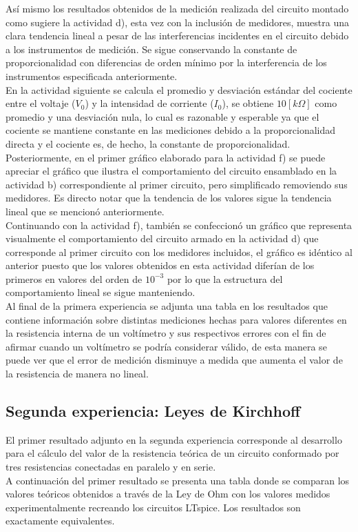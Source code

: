 \documentclass[letterpaper,11pt]{article} %
\begin{document}
Así mismo los resultados obtenidos de la medición realizada del circuito montado como sugiere la actividad d), esta vez con la inclusión de medidores, muestra una clara tendencia lineal a pesar de las interferencias incidentes en el circuito debido a los instrumentos de medición. Se sigue conservando la constante de proporcionalidad con diferencias de orden mínimo por la interferencia de los instrumentos especificada anteriormente. \\

En la actividad siguiente se calcula el promedio y desviación estándar del cociente entre el voltaje ($V_0$) y la intensidad de corriente ($I_0$), se obtiene $10 [k\Omega]$ como promedio y una desviación nula, lo cual es razonable y esperable ya que el cociente se mantiene constante en las mediciones debido a la proporcionalidad directa y el cociente es, de hecho, la constante de proporcionalidad. \\

Posteriormente, en el primer gráfico elaborado para la actividad f) se puede apreciar el gráfico que ilustra el comportamiento del circuito ensamblado en la actividad b) correspondiente al primer circuito, pero simplificado removiendo sus medidores. Es directo notar que la tendencia de los valores sigue la tendencia lineal que se mencionó anteriormente.\\

Continuando con la actividad f), también se confeccionó un gráfico que representa visualmente el comportamiento del circuito armado en la actividad d) que corresponde al primer circuito con los medidores incluidos, el gráfico es idéntico al anterior puesto que los valores obtenidos en esta actividad diferían de los primeros en valores del orden de $10^{-3}$ por lo que la estructura del comportamiento lineal se sigue manteniendo. \\

Al final de la primera experiencia se adjunta una tabla en los resultados que contiene información sobre distintas mediciones hechas para valores diferentes en la resistencia interna de un voltímetro y sus respectivos errores con el fin de afirmar cuando un voltímetro se podría considerar válido, de esta manera se puede ver que el error de medición disminuye a medida que aumenta el valor de la resistencia de manera no lineal. 

\subsection{Segunda experiencia: Leyes de Kirchhoff}
El primer resultado adjunto en la segunda experiencia corresponde al desarrollo para el cálculo del valor de la resistencia teórica de un circuito conformado por tres resistencias conectadas en paralelo y en serie. \\ A continuación del primer resultado se presenta una tabla donde se comparan los valores teóricos obtenidos a través de la Ley de Ohm con los valores medidos experimentalmente recreando los circuitos LTspice. Los resultados son exactamente equivalentes. \\
\end{document}
